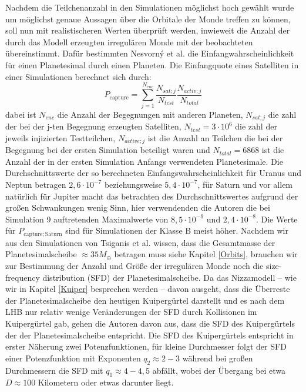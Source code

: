 \documentclass[10pt,a4paper,twoside]{article}
\newcommand{\refsec}[1]{siehe Kapitel \ref{#1}}
\begin{document}
Nachdem die Teilchenanzahl in den Simulationen möglichst hoch gewählt wurde um möglichst genaue Aussagen über die Orbitale der Monde treffen zu können, %
soll nun mit realistischeren Werten überprüft werden, inwieweit die Anzahl der durch das Modell erzeugten irregulären Monde mit der beobachteten übereinstimmt.
Dafür bestimmten Nesvorný et al. die Einfangwahrscheinlichkeit für einen Planetesimal durch einen Planeten.
Die Einfangquote eines Satelliten in einer Simulationen berechnet sich durch:
\begin{equation}
P_{\mathrm{capture}} = \sum\limits^{N_{enc}}_{j=1} \frac{N_{sat; j}}{N_{test}}\frac{N_{activ; j}}{N_{total}}
\end{equation} %
dabei ist $N_{enc}$ die Anzahl der Begegnungen mit anderen Planeten, $N_{sat;j}$ die zahl der bei der j-ten Begegnung erzeugten Satelliten, $N_{test} = 3 \cdot 10^6$ die zahl der jeweils injizierten Testteilchen, %
$N_{active; j}$ ist die Anzahl an Teilchen die bei der Begegnung bei der ersten Simulation beteiligt waren und $N_{total} = 6868$ ist die Anzahl der in der ersten Simulation Anfangs verwendeten Planetesimale\cite{Nesvorny2007}. %
Die Durchschnittswerte der so berechneten Einfangswahrscheinlichkeit für Uranus und Neptun betragen $2,6 \cdot 10^{-7}$ beziehungsweise $5,4 \cdot 10^{-7}$, für Saturn und vor allem natürlich für Jupiter macht das betrachten des Durchschnittswertes aufgrund der großen Schwankungen wenig Sinn, hier verwendenden die Autoren die bei Simulation 9 auftretenden Maximalwerte von $8,5 \cdot 10^{-9}$ und $2,4 \cdot 10^{-8}$\cite{Nesvorny2007}.
Die Werte für $P_{\mathrm{capture;Saturn}}$ sind für Simulationen der Klasse B meist höher\cite{Nesvorny2007}. %
Nachdem wir aus den Simulationen von Tsiganis et al. wissen, dass die Gesamtmasse der Planetesimalscheibe $\approx35M_\oplus$ betragen muss \refsec{Orbits}, %
brauchen wir zur Bestimmung der Anzahl und Größe der irregulären Monde noch die size-frequency distribution (SFD) der Planetesimalscheibe. %
Da das Nizzamodell – wie wir in Kapitel \ref{Kuiper} besprechen werden – davon ausgeht, dass die Überreste der Planetesimalscheibe den heutigen Kuipergürtel darstellt und es nach dem LHB nur relativ wenige Veränderungen der SFD durch Kollisionen im Kuipergürtel gab, gehen die Autoren davon aus, dass die SFD des Kuipergürtels der der Planetesimalscheibe entspricht\cite{Nesvorny2007}.
Die SFD des Kuipergürtels entspricht in erster Näherung zwei Potenzfunktionen, für kleine Durchmesser folgt der SFD einer Potenzfunktion mit Exponenten $q_2 \approx 2-3$ während bei großen Durchmessern die SFD mit $q_1 \approx 4-4,5$ abfällt, wobei der Übergang bei etwa $D \approx 100$ Kilometern oder etwas darunter liegt\cite{Nesvorny2007}. %
\end{document}

